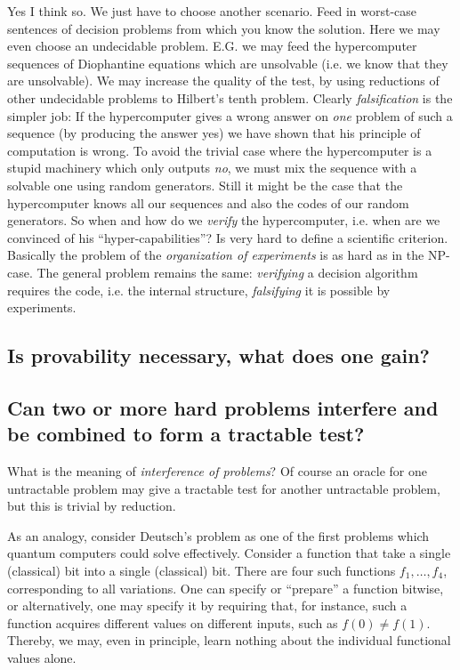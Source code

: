 \begin{Alex}
Yes I think so. We just have to choose another scenario. Feed in
worst-case sentences of decision problems from which you know the
solution. Here we may even choose an undecidable problem. E.G. we
may feed the hypercomputer sequences of Diophantine equations
which are unsolvable (i.e. we know that they are unsolvable). We
may increase the quality of the test, by using reductions of other
undecidable problems to Hilbert's tenth problem. Clearly {\em
falsification} is the simpler job: If the hypercomputer gives a
wrong answer on {\em one} problem of such a sequence (by producing
the answer yes) we have shown that his principle of computation is
wrong. To avoid the trivial case where the hypercomputer is a
stupid machinery which only outputs {\em no}, we must mix the
sequence with a solvable one using random generators. Still it
might be the case that the hypercomputer knows all our sequences
and also the codes of our random generators. So when and how do we
{\em verify} the hypercomputer, i.e. when are we convinced of his
``hyper-capabilities''? Is very hard to define a scientific
criterion. Basically the problem of the {\em organization of
experiments} is as hard as in the NP-case. The general problem
remains the same: {\em verifying} a decision algorithm requires
the code, i.e. the internal structure, {\em falsifying} it is
possible by experiments.
\end{Alex}

\subsection{Is provability necessary, what does one gain?}

\subsection{Can two or more hard problems interfere and be
 combined to form a tractable test?}

\begin{Alex}
What is the meaning of {\em interference of problems}? Of course
an oracle for one untractable problem may give a tractable test
for another untractable problem, but this is trivial by reduction.
\end{Alex}

\begin{Karl}
As an analogy, consider Deutsch's problem as one of the first problems which
quantum computers could solve effectively.
Consider a function that take a single (classical) bit into a single (classical) bit.
There are four such functions $f_1,\ldots ,f_4$, corresponding to all variations.
One can specify or ``prepare'' a function bitwise, or alternatively,
one may specify it by requiring that, for instance, such a function
acquires different values on different inputs, such as $f(0)\neq f(1)$.
Thereby, we may, even in principle, learn nothing about the individual functional values alone.
\end{Karl}

